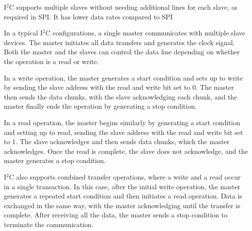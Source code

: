\begin{itemize}
\begin{itemize}
                I$^2$C supports multiple slaves without needing additional lines for each slave, as required in SPI. 
                It has lower data rates compared to SPI
        
                In a typical I$^2$C configurations, a single master communicates with multiple slave devices. 
                The master initiates all data transfers and generates the clock signal. 
                Both the master and the slaves can control the data line depending on whether the operation is a read or write.

                In a write operation, the master generates a start condition and sets up to write by sending the slave address with the read and write bit set to 0. 
                The master then sends the data chunks, with the slave acknowledging each chunk, and the master finally ends the operation by generating a stop condition.

                In a read operation, the master begins similarly by generating a start condition and setting up to read, sending the slave address with the read and write bit set to 1. 
                The slave acknowledges and then sends data chunks, which the master acknowledges. 
                Once the read is complete, the slave does not acknowledge, and the master generates a stop condition.

                I$^2$C also supports combined transfer operations, where a write and a read occur in a single transaction. 
                In this case, after the initial write operation, the master generates a repeated start condition and then initiates a read operation. 
                Data is exchanged in the same way, with the master acknowledging until the transfer is complete. 
                After receiving all the data, the master sends a stop condition to terminate the communication.
        \end{itemize}
\end{itemize}